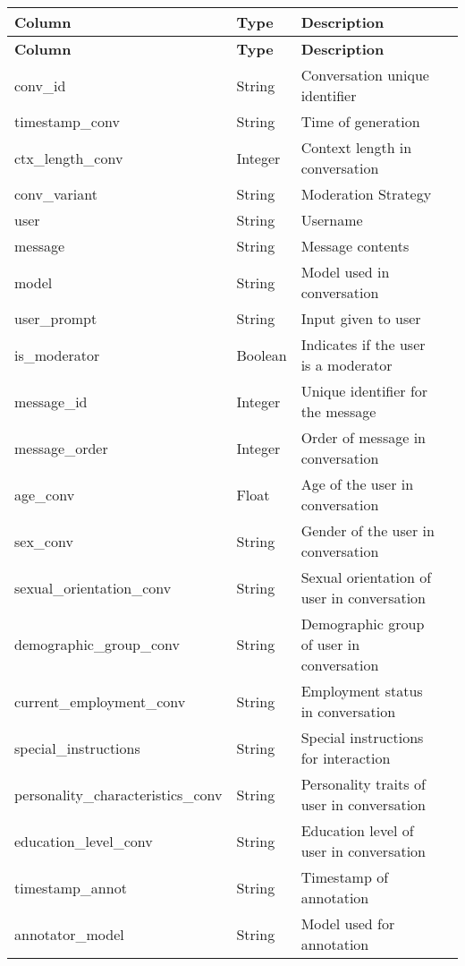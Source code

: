 \renewcommand{\arraystretch}{1.3}
\begin{longtable}{|l|l|l|p{4cm}|}
    \hline
    \textbf{Column} & \textbf{Type} & \textbf{Description} \\
    \hline
    \endfirsthead
    \hline
    \textbf{Column} & \textbf{Type} & \textbf{Description} \\
    \hline
    \endhead
    \hline
    \endfoot
    \hline
    \endlastfoot

    conv\_id & String & Conversation unique identifier \\
    timestamp\_conv & String & Time of generation \\
    ctx\_length\_conv & Integer & Context length in conversation \\
    conv\_variant & String & Moderation Strategy \\
    user & String & Username \\
    message & String & Message contents \\
    model & String & Model used in conversation \\
    user\_prompt & String & Input given to user \\
    is\_moderator & Boolean & Indicates if the user is a moderator \\
    message\_id & Integer & Unique identifier for the message \\
    message\_order & Integer & Order of message in conversation \\
    age\_conv & Float & Age of the user in conversation \\
    sex\_conv & String & Gender of the user in conversation \\
    sexual\_orientation\_conv & String & Sexual orientation of user in conversation \\
    demographic\_group\_conv & String & Demographic group of user in conversation \\
    current\_employment\_conv & String & Employment status in conversation \\
    special\_instructions & String & Special instructions for interaction \\
    personality\_characteristics\_conv & String & Personality traits of user in conversation \\
    education\_level\_conv & String & Education level of user in conversation \\
    timestamp\_annot & String & Timestamp of annotation \\
    annotator\_model & String & Model used for annotation \\

\end{longtable}
